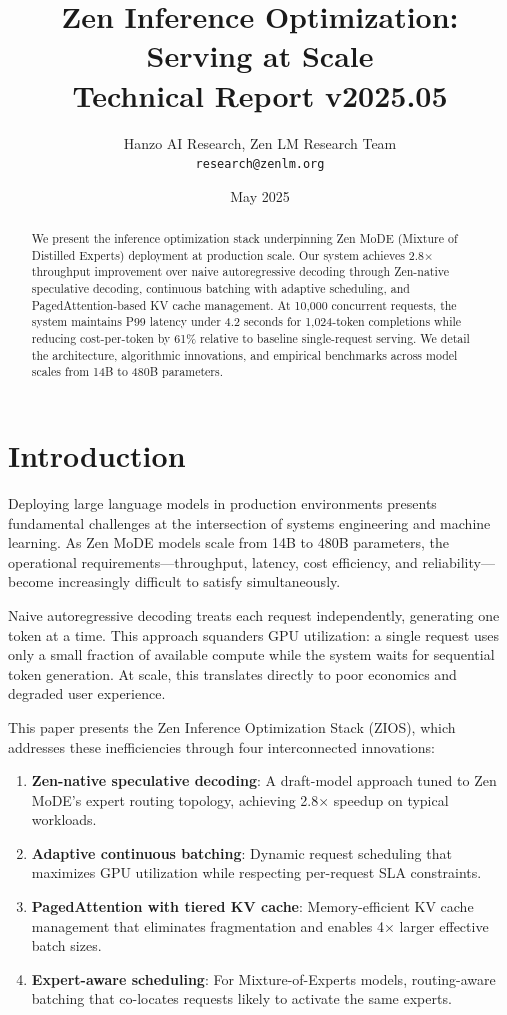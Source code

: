 \documentclass[11pt,a4paper]{article}
\title{\textbf{Zen Inference Optimization: Serving at Scale}\\
\large Technical Report v2025.05}
\author{Hanzo AI Research, Zen LM Research Team\\
\texttt{research@zenlm.org}}
\date{May 2025}
\begin{document}
\maketitle

\begin{abstract}
We present the inference optimization stack underpinning Zen MoDE (Mixture of Distilled Experts) deployment at production scale. Our system achieves 2.8$\times$ throughput improvement over naive autoregressive decoding through Zen-native speculative decoding, continuous batching with adaptive scheduling, and PagedAttention-based KV cache management. At 10,000 concurrent requests, the system maintains P99 latency under 4.2 seconds for 1,024-token completions while reducing cost-per-token by 61\% relative to baseline single-request serving. We detail the architecture, algorithmic innovations, and empirical benchmarks across model scales from 14B to 480B parameters.
\end{abstract}

\section{Introduction}

Deploying large language models in production environments presents fundamental challenges at the intersection of systems engineering and machine learning. As Zen MoDE models scale from 14B to 480B parameters, the operational requirements—throughput, latency, cost efficiency, and reliability—become increasingly difficult to satisfy simultaneously.

Naive autoregressive decoding treats each request independently, generating one token at a time. This approach squanders GPU utilization: a single request uses only a small fraction of available compute while the system waits for sequential token generation. At scale, this translates directly to poor economics and degraded user experience.

This paper presents the Zen Inference Optimization Stack (ZIOS), which addresses these inefficiencies through four interconnected innovations:

\begin{enumerate}
  \item \textbf{Zen-native speculative decoding}: A draft-model approach tuned to Zen MoDE's expert routing topology, achieving 2.8$\times$ speedup on typical workloads.
  \item \textbf{Adaptive continuous batching}: Dynamic request scheduling that maximizes GPU utilization while respecting per-request SLA constraints.
  \item \textbf{PagedAttention with tiered KV cache}: Memory-efficient KV cache management that eliminates fragmentation and enables 4$\times$ larger effective batch sizes.
  \item \textbf{Expert-aware scheduling}: For Mixture-of-Experts models, routing-aware batching that co-locates requests likely to activate the same experts.
\end{enumerate}
\end{document}
